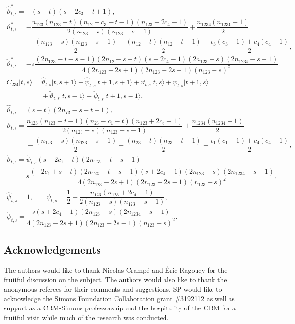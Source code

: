 \documentclass[pdftex]{sigma}
\numberwithin{equation}{section}
\begin{document}
\begin{gather*}
\hat{\vartheta}^*_{t,s}=-(s-t)(s-2c_3-t+1),\\
\vartheta^*_{t,s}=-\dfrac{n_{123}(n_{123}-t)(n_{12}-c_3-t-1)(n_{123}+2c_4-1)}{2(n_{123}-s)(n_{123}-s-1)}+\dfrac{n_{1234}(n_{1234}-1)}{2}\\
\phantom{\vartheta^*_{t,s}=}{}-\dfrac{(n_{123}-s)(n_{123}-s-1)}{2}+\dfrac{(n_{12}-t)(n_{12}-t-1)}{2}+\dfrac{c_3(c_3-1)+c_4(c_4-1)}{2},\\
\check{\vartheta}^*_{t,s}=-s\dfrac{(2n_{123}-t-s-1)(2n_{12}-s-t)(s+2c_4-1)(2n_{123}-s)(2n_{1234}-s-1)}{4(2n_{123}-2s+1)(2n_{123}-2s-1)(n_{123}-s)^2},
\\
C_{234}\vert t,s\rangle =\hat{\vartheta}_{t,s}\vert t,s+1\rangle+\hat{\psi}_{t,s}\vert t+1,s+1\rangle
  +\vartheta_{t,s}\vert t,s\rangle+\psi_{t,s}\vert t+1,s\rangle
\\
  \phantom{C_{234}\vert t,s\rangle =}{} +\check{\vartheta}_{t,s}\vert t,s-1\rangle+\check{\psi}_{t,s}\vert t+1,s-1\rangle,\\
  \hat{\vartheta}_{t,s}=(s-t)(2n_{23}-s-t-1),\\
  \vartheta_{t,s}=\dfrac{n_{123}(n_{123}-t-1)(n_{23}-c_1-t)(n_{123}+2c_4-1)}{2(n_{123}-s)(n_{123}-s-1)}+\dfrac{n_{1234}(n_{1234}-1)}{2}\\
\phantom{\vartheta_{t,s}=}{}-\dfrac{(n_{123}-s)(n_{123}-s-1)}{2}+\dfrac{(n_{23}-t)(n_{23}-t-1)}{2}+\dfrac{c_1(c_1-1)+c_4(c_4-1)}{2},\\
  \check{\vartheta}_{t,s}=\check{\psi}_{t,s}(s-2c_1-t)(2n_{123}-t-s-1)\\
  \phantom{  \check{\vartheta}_{t,s}}{}=s\dfrac{(-2c_1+s-t)(2n_{123}-t-s-1)(s+2c_4-1)(2n_{123}-s)(2n_{1234}-s-1)}{4(2n_{123}-2s+1)(2n_{123}-2s-1)(n_{123}-s)^2},\\
  \hat{\psi}_{t,s}=1,\qquad
  \psi_{t,s}=\dfrac{1}{2}+\dfrac{n_{123}(n_{123}+2c_4-1)}{2(n_{123}-s)(n_{123}-s-1)},\\
  \check{\psi}_{t,s}=\dfrac{s(s+2c_4-1)(2n_{123}-s)(2n_{1234}-s-1)}{4(2n_{123}-2s+1)(2n_{123}-2s-1)(n_{123}-s)^2}.
\end{gather*}

\subsection*{Acknowledgements}

The authors would like to thank Nicolas Cramp\'{e} and \'{E}ric Ragoucy for the fruitful discussion on the subject. The authors would also like to thank the anonymous referees for their comments and suggestions.
SP would like to acknowledge the Simons Foundation Collaboration grant \#3192112 as well as support as a CRM-Simons professorship and the hospitality of the CRM for a fruitful visit while much of the research was conducted.
\end{document}
